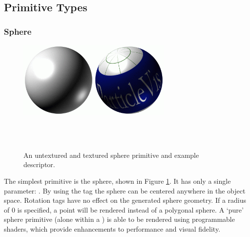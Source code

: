 \subsection{Primitive Types}

\subsubsection{Sphere}
\begin{figure}
 \begin{center}
   \includegraphics[width=3in]{pics/spheres.png}
 \end{center}            
        \hspace*{2in}   \\
        \hspace*{2.2in} \\
  \hspace*{2in}         
        \caption[An untextured and textured sphere primitive]{An untextured and textured sphere primitive and example descriptor.}
        \label{fig:SpherePrimitive}     
\end{figure}
The simplest primitive is the sphere, shown in Figure \ref{fig:SpherePrimitive}.  It has only a single parameter: .
By using the  tag the sphere can be centered anywhere in the object space.
Rotation tags have no effect on the generated sphere geometry.  If a radius of 0 is specified, a point will be rendered instead of a polygonal sphere.  A `pure' sphere primitive (alone within a ) is able to be rendered using programmable shaders, which provide enhancements to performance and visual fidelity.


